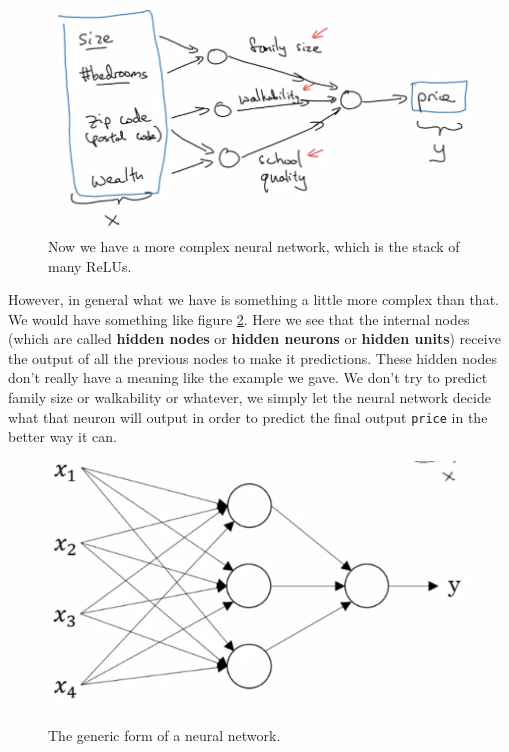 \documentclass[12pt, a4paper, oneside]{book}
\begin{document}
\begin{figure}[h]
\centering
\includegraphics[scale=0.6]{Res/housing_nn.png}
\caption{Now we have a more complex neural network, which is the stack of many
ReLUs.}
\label{/housing_nn.png}
\end{figure}

However, in general what we have is something a little more complex than that.
We would have something like figure \ref{nn_generic.png}. Here we see that the
internal nodes (which are called \textbf{hidden nodes} or \textbf{hidden
neurons} or \textbf{hidden units}) receive the output of all the previous nodes
to make it predictions. These hidden nodes don't really have a meaning like the
example we gave. We don't try to predict family size or walkability or whatever,
we simply let the neural network decide what that neuron will output in order to
predict the final output \texttt{price} in the better way it can.

\begin{figure}[h]
\centering
\includegraphics[scale=0.8]{Res/nn_generic.png}
\caption{The generic form of a neural network.}
\label{nn_generic.png}
\end{figure}
\end{document}
